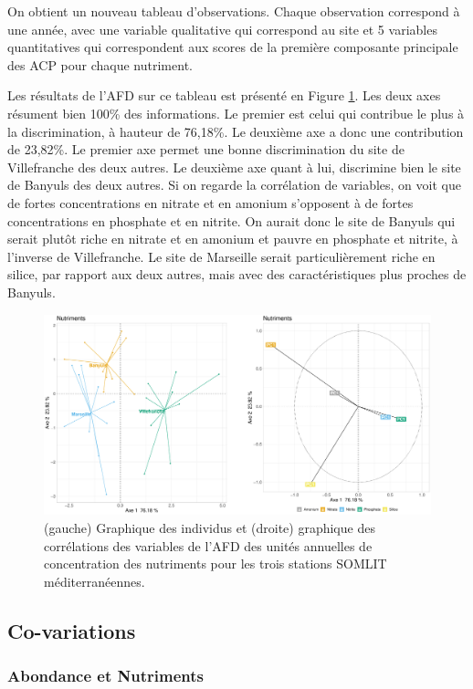 \documentclass[12pt]{article}
\begin{document}
On obtient un nouveau tableau d’observations. Chaque observation correspond à une année, avec une variable qualitative qui correspond au site et 5 variables quantitatives qui correspondent aux scores de la première composante principale des ACP pour chaque nutriment. 

Les résultats de l’AFD sur ce tableau est présenté en Figure \ref{afd_nut}. Les deux axes résument bien 100\% des informations. Le premier est celui qui contribue le plus à la discrimination, à hauteur de 76,18\%. Le deuxième axe a donc une contribution de 23,82\%. Le premier axe permet une bonne discrimination du site de Villefranche des deux autres. Le deuxième axe quant à lui, discrimine bien le site de Banyuls des deux autres. Si on regarde la corrélation de variables, on voit que de fortes concentrations en nitrate et en amonium s’opposent à de fortes concentrations en phosphate et en nitrite. On aurait donc le site de Banyuls qui serait plutôt riche en nitrate et en amonium et pauvre en phosphate et nitrite, à l’inverse de  Villefranche. Le site de Marseille serait particulièrement riche en silice, par rapport aux deux autres, mais avec des caractéristiques plus proches de Banyuls. 


\begin{figure}
\centering
\includegraphics[width=.95\textwidth]{fig/R223_FDA_nutri.pdf}
\caption{(gauche) Graphique des individus et (droite) graphique des corrélations des variables de l'AFD des unités annuelles de concentration des nutriments pour les trois stations SOMLIT méditerranéennes.}
\label{afd_nut}
\end{figure}

\subsection{Co-variations}

\subsubsection{Abondance et Nutriments}
\end{document}
